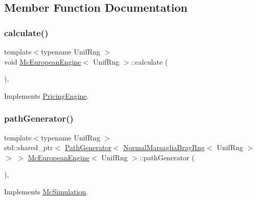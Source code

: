 \subsection{Member Function Documentation}
\hypertarget{class_mc_european_engine_a51b2f0147fbaf2b84c65851bbc2baa7b}{}\label{class_mc_european_engine_a51b2f0147fbaf2b84c65851bbc2baa7b} 
\subsubsection{\texorpdfstring{calculate()}{calculate()}}
{\footnotesize\ttfamily template$<$typename Unif\+Rng $>$ \\
void \hyperlink{class_mc_european_engine}{Mc\+European\+Engine}$<$ Unif\+Rng $>$\+::calculate (\begin{DoxyParamCaption}{ }\end{DoxyParamCaption})\hspace{0.3cm}{\ttfamily [override]}, {\ttfamily [virtual]}}



Implements \hyperlink{class_pricing_engine_a733511ffc3cf5e4dc1fbc2a39208d8bd}{Pricing\+Engine}.

\hypertarget{class_mc_european_engine_ae2a93d63269eac42449f8b958ec15535}{}\label{class_mc_european_engine_ae2a93d63269eac42449f8b958ec15535} 
\subsubsection{\texorpdfstring{path\+Generator()}{pathGenerator()}}
{\footnotesize\ttfamily template$<$typename Unif\+Rng $>$ \\
std\+::shared\+\_\+ptr$<$ \hyperlink{class_path_generator}{Path\+Generator}$<$ \hyperlink{class_normal_marsaglia_bray_rng}{Normal\+Marsaglia\+Bray\+Rng}$<$ Unif\+Rng $>$ $>$ $>$ \hyperlink{class_mc_european_engine}{Mc\+European\+Engine}$<$ Unif\+Rng $>$\+::path\+Generator (\begin{DoxyParamCaption}{ }\end{DoxyParamCaption})\hspace{0.3cm}{\ttfamily [override]}, {\ttfamily [virtual]}}



Implements \hyperlink{class_mc_simulation_ada27dc346c81cf3d7aff84188dd12381}{Mc\+Simulation}.


